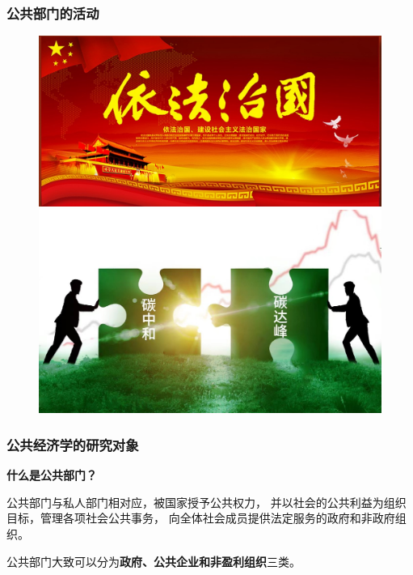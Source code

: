 \documentclass[aspectratio=169, 12pt]{beamer}
\begin{document}
\begin{frame}[plain]
    \frametitle{公共部门的活动}
    \begin{figure}
        \centering
        \begin{minipage}[t]{0.5\linewidth}
            \centering
            \includegraphics[width=1.0\textwidth]{./resources/figure/lawn.jpg}
        \end{minipage}%
        \begin{minipage}[t]{0.5\linewidth}
            \centering
            \includegraphics[width=1.0\textwidth]{./resources/figure/co.jpg}
        \end{minipage}
    \end{figure}
\end{frame}

\begin{frame}[plain]
    \frametitle{公共经济学的研究对象}
    \textbf{什么是公共部门？} \par
    \addtolength{\parskip}{.8em}
    公共部门与私人部门相对应，被国家授予公共权力，
    并以社会的公共利益为组织目标，管理各项社会公共事务，
    向全体社会成员提供法定服务的政府和非政府组织。\par
    \addtolength{\parskip}{.8em}
    公共部门大致可以分为\textbf{政府、公共企业和非盈利组织}三类。
\end{frame}
\end{document}
